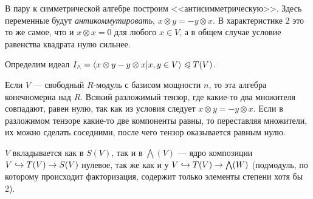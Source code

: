 В пару к симметрической алгебре построим <<антисимметрическую>>.
Здесь переменные будут \textit{антикоммутировать}, $x \otimes y = -y \otimes x$.
В характеристике 2 это то же самое, что и $x \otimes x = 0$ для любого $x \in V$, а в общем случае условие равенства квадрата нулю сильнее.

Определим идеал $I_{\wedge} = \left\langle x \otimes y - y \otimes x \middle| x, y \in V\right\rangle \trianglelefteqslant T(V)$.

Если $V$ --- свободный $R$-модуль с базисом мощности $n$, то эта алгебра конечномерна над $R$.
Всякий разложимый тензор, где какие-то два множителя совпадают, равен нулю, так как из условия следует $x \otimes y = -y \otimes x$.
Если в разложимом тензоре какие-то две компоненты равны, то переставляя множители, их можно сделать соседними, после чего тензор оказывается равным нулю.

$V$ вкладывается как в $S(V)$, так и в $\bigwedge(V)$ --- ядро композиции $V \hookrightarrow T(V) \rightarrow S(V)$ нулевое, так же как и у $V \hookrightarrow T(V) \rightarrow \bigwedge(W)$ (подмодуль, по которому происходит факторизация, содержит только элементы степени хотя бы 2).

